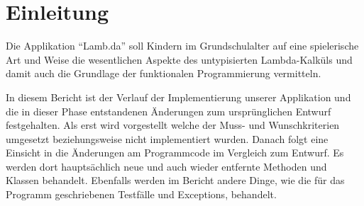 \section{Einleitung}

Die Applikation "`Lamb.da"' soll Kindern im Grundschulalter auf eine spielerische Art und Weise die wesentlichen Aspekte des untypisierten Lambda-Kalküls und damit auch die Grundlage der funktionalen Programmierung vermitteln.

In diesem Bericht ist der Verlauf der Implementierung unserer Applikation und die in dieser Phase entstandenen Änderungen zum ursprünglichen Entwurf festgehalten. Als erst wird vorgestellt welche der Muss- und Wunschkriterien umgesetzt beziehungsweise nicht implementiert wurden. Danach folgt eine Einsicht in die Änderungen am Programmcode im Vergleich zum Entwurf. Es werden dort hauptsächlich neue und auch wieder entfernte Methoden und Klassen behandelt. Ebenfalls werden im Bericht andere Dinge, wie die für das Programm geschriebenen Testfälle und Exceptions, behandelt.